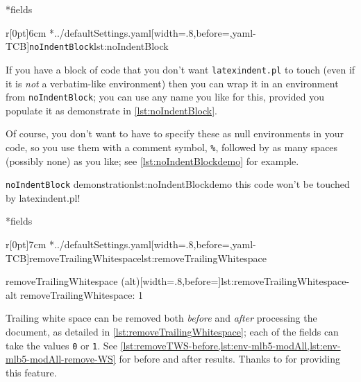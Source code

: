 *{fields}

	\begin{wrapfigure}[8]{r}[0pt]{6cm}
		\cmhlistingsfromfile[style=noIndentBlock]*{../defaultSettings.yaml}[width=.8\linewidth,before=\centering,yaml-TCB]{\texttt{noIndentBlock}}{lst:noIndentBlock}
	\end{wrapfigure}
	If you have a block of code that you don't want \texttt{latexindent.pl} to touch (even if
	it is \emph{not} a verbatim-like environment) then you can wrap it in an
	environment from \texttt{noIndentBlock}; you can use any name you like for this,
	provided you populate it as demonstrate in \cref{lst:noIndentBlock}.

	Of course, you don't want to have to specify these as null environments in your code, so
	you use them with a comment symbol, \lstinline!%!, followed by as many spaces
	(possibly none) as you like; see \cref{lst:noIndentBlockdemo} for example.

	\begin{cmhlistings}[style=demo,escapeinside={(*@}{@*)}]{\texttt{noIndentBlock} demonstration}{lst:noIndentBlockdemo}
        this code
                won't
     be touched
                    by
             latexindent.pl!
	\end{cmhlistings}

*{fields}\label{yaml:removeTrailingWhitespace}

	\begin{wrapfigure}[10]{r}[0pt]{7cm}
		\cmhlistingsfromfile[style=removeTrailingWhitespace]*{../defaultSettings.yaml}[width=.8\linewidth,before=\centering,yaml-TCB]{removeTrailingWhitespace}{lst:removeTrailingWhitespace}

		\vspace{.1cm}
		\begin{yaml}[numbers=none]{removeTrailingWhitespace (alt)}[width=.8\linewidth,before=\centering]{lst:removeTrailingWhitespace-alt}
removeTrailingWhitespace: 1
\end{yaml}
	\end{wrapfigure}
	Trailing white space can be removed both \emph{before} and
	\emph{after} processing the document, as detailed in \cref{lst:removeTrailingWhitespace};
	each of the fields can take the values \texttt{0} or
	\texttt{1}. See \vref{lst:removeTWS-before,lst:env-mlb5-modAll,lst:env-mlb5-modAll-remove-WS} for before and after results. Thanks
	to \cite{vosskuhle} for providing this feature.

